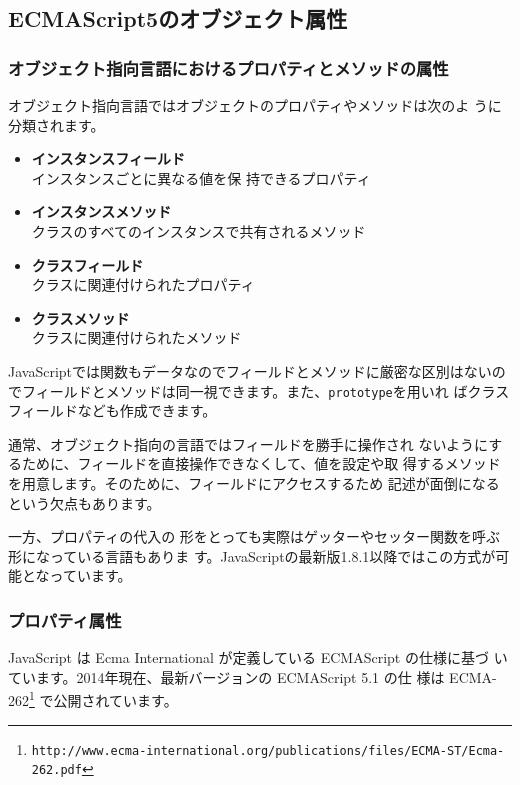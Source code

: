 \subsection{ECMAScript5のオブジェクト属性}
\subsubsection{オブジェクト指向言語におけるプロパティとメソッドの属性}
オブジェクト指向言語ではオブジェクトのプロパティやメソッドは次のよ
うに分類されます。
\begin{itemize}
 \item {\bfseries インスタンスフィールド}\\インスタンスごとに異なる値を保
       持できるプロパティ
 \item {\bfseries インスタンスメソッド}\\
クラスのすべてのインスタンスで共有されるメソッド
 \item {\bfseries クラスフィールド}\\クラスに関連付けられたプロパティ
 \item {\bfseries クラスメソッド}\\
クラスに関連付けられたメソッド
\end{itemize}
JavaScriptでは関数もデータなのでフィールドとメソッドに厳密な区別はないの
でフィールドとメソッドは同一視できます。また、\texttt{prototype}を用いれ
ばクラスフィールドなども作成できます。

通常、オブジェクト指向の言語ではフィールドを勝手に操作され
ないようにするために、フィールドを直接操作できなくして、値を設定や取
得するメソッドを用意します。そのために、フィールドにアクセスするため
記述が面倒になるという欠点もあります。

一方、プロパティの代入の
形をとっても実際はゲッターやセッター関数を呼ぶ形になっている言語もありま
す。JavaScriptの最新版1.8.1以降ではこの方式が可能となっています。
\subsubsection{プロパティ属性}
JavaScript は Ecma International が定義している ECMAScript の仕様に基づ
いています。2014年現在、最新バージョンの ECMAScript 5.1 の仕
様は
ECMA-262\footnote{\texttt{http://www.ecma-international.org/publications/files/ECMA-ST/Ecma-262.pdf}}
で公開されています。

